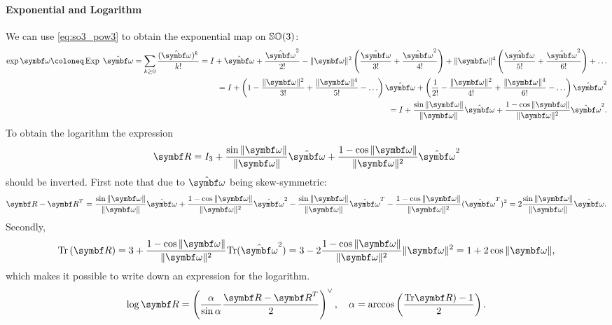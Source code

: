 \paragraph{Exponential and Logarithm}

We can use \eqref{eq:so3_pow3} to obtain the exponential map on ${\mathbb{SO}(3)}$:
\begin{equation}
  \begin{aligned}
    \exp \bomega \coloneq \Exp \; \hat {\bomega} = \sum_{k \geq 0} \frac{(\hat {\bomega})^k}{k!} = I + \hat{\bomega} + \frac{\hat{\bomega}^2}{2!} - \| \bomega \|^2 \left( \frac{\hat {\bomega}}{3!} + \frac{\hat {\bomega}^2}{4!} \right) + \| \bomega \|^4 \left( \frac{\hat {\bomega}}{5!} + \frac{\hat {\bomega}^2}{6!} \right) + \ldots \\
    = I + \left( 1 - \frac{\|\bomega \|^2}{3!} + \frac{\|\bomega \|^4}{5!} - \ldots \right) \hat{\bomega} + \left( \frac{1}{2!} - \frac{\|\bomega \|^2}{4!} + \frac{\|\bomega \|^4}{6!} - \ldots \right) \hat{\bomega}^2                                                                                                                     \\
    = I + \frac{\sin \| \bomega \|}{\|\bomega \|} \hat {\bomega} + \frac{1 - \cos \| \bomega \|}{\| \bomega \|^2} \hat {\bomega}^2.
  \end{aligned}
\end{equation}
To obtain the logarithm the expression
\begin{equation}
  \bR = I_3 + \frac{\sin \| \bomega \|}{\|\bomega \|} \hat {\bomega} + \frac{1 - \cos \| \bomega \|}{\| \bomega \|^2} \hat {\bomega}^2
\end{equation}
should be inverted. First note that due to $\hat \bomega$ being skew-symmetric:
\begin{equation}
  \label{eq:so3_log_deriv1}
  \bR - \bR^T =  \frac{\sin \| \bomega \|}{\|\bomega \|} \hat {\bomega} + \frac{1 - \cos \| \bomega \|}{\| \bomega \|^2} \hat {\bomega}^2 - \frac{\sin \| \bomega \|}{\|\bomega \|} \hat {\bomega} ^T - \frac{1 - \cos \| \bomega \|}{\| \bomega \|^2} (\hat {\bomega}^T)^2 = 2 \frac{\sin \|\bomega \|}{\| \bomega \|} \hat \bomega.
\end{equation}
Secondly,
\begin{equation}
  \label{eq:so3_log_deriv2}
  \tr \left(\bR  \right) = 3 + \frac{1 - \cos \| \bomega \|}{\|\bomega \|^2} \tr(\hat \bomega^2) =3 - 2 \frac{1 - \cos \| \bomega \|}{\|\bomega \|^2} \| \bomega \|^2 = 1 + 2 \cos \| \bomega \|,
\end{equation}
which makes it possible to write down an expression for the logarithm.
\begin{equation}
  \log \bR = \left(\frac{\alpha}{\sin \alpha} \frac{\bR - \bR^T}{2}\right)^\vee, \quad \alpha = \arccos \left( \frac{\tr\bR) - 1}{2} \right).
\end{equation}

